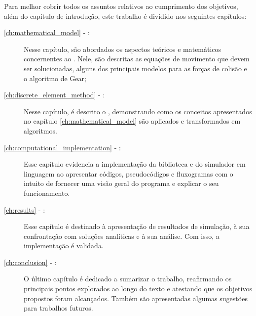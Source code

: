 Para melhor cobrir todos os assuntos relativos ao cumprimento dos objetivos, além do capítulo de introdução, este trabalho é dividido nos seguintes capítulos:
\begin{description}
	\item[\autoref{ch:mathematical_model} - :] Nesse capítulo, são abordados os aspectos teóricos e matemáticos concernentes ao \DEM{}. Nele, são descritas as equações de movimento que devem ser solucionadas, alguns dos principais modelos para as forças de colisão e o algoritmo de Gear;
	\item[\autoref{ch:discrete_element_method} - :] Nesse capítulo, é descrito o \DEM{}, demonstrando como os conceitos apresentados no capítulo \ref{ch:mathematical_model} são aplicados e transformados em algoritmos.
	\item[\autoref{ch:computational_implementation} - :] Esse capítulo evidencia a implementação da biblioteca e do simulador em linguagem \CC{} ao apresentar códigos, pseudocódigos e fluxogramas com o intuito de fornecer uma visão geral do programa e explicar o seu funcionamento.
	\item[\autoref{ch:results} - :] Esse capítulo é destinado à apresentação de resultados de simulação, à sua confrontação com soluções analíticas e à sua análise. Com isso, a implementação é validada.
	\item[\autoref{ch:conclusion} - :] O último capítulo é dedicado a sumarizar o trabalho, reafirmando os principais pontos explorados ao longo do texto e atestando que os objetivos propostos foram alcançados. Também são apresentadas algumas sugestões para trabalhos futuros.
\end{description}